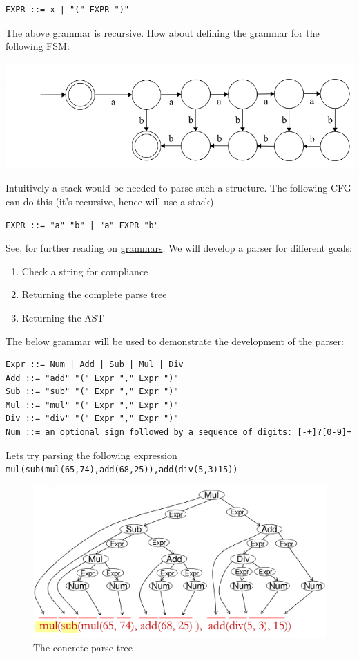 \documentclass[
]{book}
\providecommand{\tightlist}{%
  \setlength{\itemsep}{0pt}\setlength{\parskip}{0pt}}
\begin{document}
\begin{verbatim}
EXPR ::= x | "(" EXPR ")"
\end{verbatim}

The above grammar is recursive. How about defining the grammar for the following FSM:

\includegraphics{img/09-image05.png}

Intuitively a stack would be needed to parse such a structure. The following CFG can do this (it's recursive, hence will use a stack)

\begin{verbatim}
EXPR ::= "a" "b" | "a" EXPR "b"
\end{verbatim}

See, for further reading on \href{http://web.mit.edu/6.005/www/fa16/classes/17-regex-grammars/}{grammars}. We will develop a parser for different goals:

\begin{enumerate}
\def\labelenumi{\arabic{enumi}.}
\tightlist
\item
  Check a string for compliance
\item
  Returning the complete parse tree
\item
  Returning the AST
\end{enumerate}

The below grammar will be used to demonstrate the development of the parser:

\begin{verbatim}
Expr ::= Num | Add | Sub | Mul | Div
Add ::= "add" "(" Expr "," Expr ")"
Sub ::= "sub" "(" Expr "," Expr ")"
Mul ::= "mul" "(" Expr "," Expr ")"
Div ::= "div" "(" Expr "," Expr ")"
Num ::= an optional sign followed by a sequence of digits: [-+]?[0-9]+
\end{verbatim}

Lets try parsing the following expression \texttt{mul(sub(mul(65,74),add(68,25)),add(div(5,3)15))}

\begin{figure}
\centering
\includegraphics{img/09-image06.png}
\caption{\label{fig:example-cpt}The concrete parse tree}
\end{figure}
\end{document}
